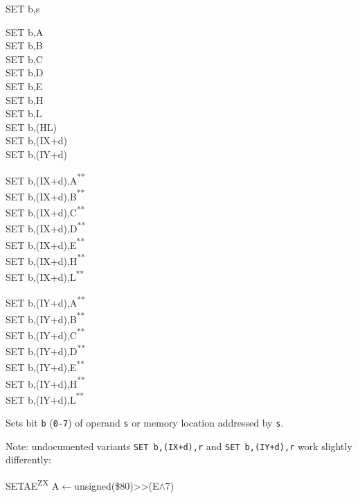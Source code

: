 \documentclass[12pt,twoside,openright,a4paper]{book}
\newcommand{\UNDOC}{\textnormal{\textsuperscript{**}}}
\newcommand{\ZXN}{\textnormal{\textsuperscript{ZX}}}
\begin{document}
\begin{basedescript}{
	\desclabelstyle{\multilinelabel}
	\desclabelwidth{3cm}}
\begin{detailitem}{SET b,s}
		\begin{DetailVariants}
			SET b,A\\
			SET b,B\\
			SET b,C\\
			SET b,D\\
			SET b,E\\
			SET b,H\\
			SET b,L\\
			SET b,(HL)\\
			SET b,(IX+d)\\
			SET b,(IY+d)

			\columnbreak
			SET b,(IX+d),A\UNDOC\\
			SET b,(IX+d),B\UNDOC\\
			SET b,(IX+d),C\UNDOC\\
			SET b,(IX+d),D\UNDOC\\
			SET b,(IX+d),E\UNDOC\\
			SET b,(IX+d),H\UNDOC\\
			SET b,(IX+d),L\UNDOC

			\columnbreak
			SET b,(IY+d),A\UNDOC\\
			SET b,(IY+d),B\UNDOC\\
			SET b,(IY+d),C\UNDOC\\
			SET b,(IY+d),D\UNDOC\\
			SET b,(IY+d),E\UNDOC\\
			SET b,(IY+d),H\UNDOC\\
			SET b,(IY+d),L\UNDOC
		\end{DetailVariants}

		Sets bit {\tt b} ({\tt 0-7}) of operand {\tt s} or memory location addressed by {\tt s}.

		Note: undocumented variants {\tt SET b,(IX+d),r} and {\tt SET b,(IY+d),r} work slightly differently:


		\DetailNoEffect
						
		\begin{DetailTiming}
		\end{DetailTiming}

	\end{detailitem}

	\begin{detailitem}{SETAE\ZXN}
		{A$\leftarrow$unsigned(\$80)>>(E$\wedge$7)}


\end{detailitem}
\end{basedescript}
\end{document}
